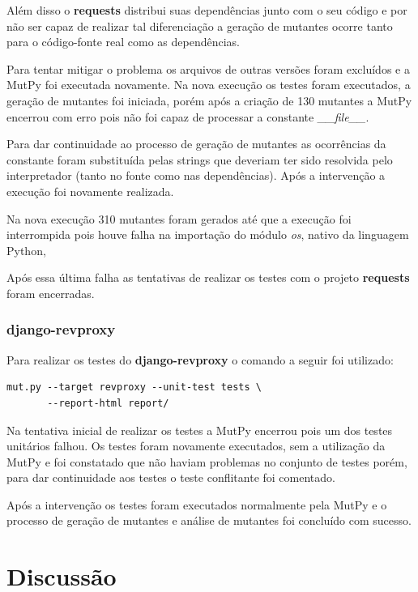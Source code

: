 \documentclass[12pt]{article}
\begin{document}
Além disso o \textbf{requests} distribui suas dependências junto com o
seu código e por não ser capaz de realizar tal diferenciação a geração 
de mutantes ocorre tanto para o código-fonte real como as dependências.

Para tentar mitigar o problema os arquivos de outras versões foram
excluídos e a MutPy foi executada novamente. Na nova execução os testes
foram executados, a geração de mutantes foi iniciada, porém
após a criação de 130 mutantes a MutPy encerrou com erro pois não foi
capaz de processar a constante \textit{\_\_file\_\_}.

Para dar continuidade ao processo de geração de mutantes as 
ocorrências da constante foram substituída pelas strings que deveriam ter
sido resolvida pelo interpretador (tanto no fonte como nas dependências).
Após a intervenção a execução foi novamente realizada.

Na nova execução 310 mutantes foram gerados até que a execução foi
interrompida pois houve falha na importação do módulo \textit{os}, nativo
da linguagem Python, 

Após essa última falha as tentativas de realizar os testes com o projeto
\textbf{requests} foram encerradas.

\subsubsection{django-revproxy}

Para realizar os testes do \textbf{django-revproxy} o comando a seguir
foi utilizado:

\begin{verbatim}
mut.py --target revproxy --unit-test tests \
       --report-html report/
\end{verbatim}

Na tentativa inicial de realizar os testes a MutPy encerrou pois
um dos testes unitários falhou. Os testes foram novamente executados,
sem a utilização da MutPy e foi constatado que não haviam problemas no
conjunto de testes porém, para dar continuidade aos testes o teste 
conflitante foi comentado. 

Após a intervenção os testes foram executados normalmente pela MutPy
e o processo de geração de mutantes e análise de mutantes foi concluído
com sucesso.

\section{Discussão}
\end{document}

